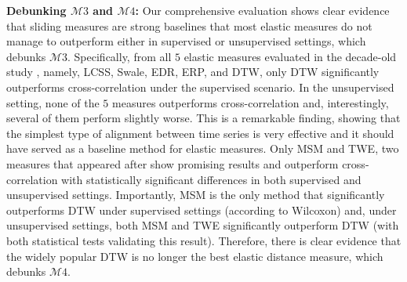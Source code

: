 \documentclass[11pt]{article}
\begin{document}
\noindent \textbf{Debunking $\mathcal{M}3$ and $\mathcal{M}4$: } Our comprehensive evaluation shows clear evidence that sliding measures are strong baselines that most elastic measures do not manage to outperform either in supervised or unsupervised settings, which debunks $\mathcal{M}3$. Specifically, from all $5$ elastic measures evaluated in the decade-old study \cite{ding2008querying}, namely, LCSS, Swale, EDR, ERP, and DTW, only DTW significantly outperforms cross-correlation under the supervised scenario. In the unsupervised setting, none of the $5$ measures outperforms cross-correlation and, interestingly, several of them perform slightly worse. This is a remarkable finding, showing that the simplest type of alignment between time series is very effective and it should have served as a baseline method for elastic measures. Only MSM and TWE, two measures that appeared after \cite{ding2008querying} show promising results and outperform cross-correlation with statistically significant differences in both supervised and unsupervised settings. Importantly, MSM is the only method that significantly outperforms DTW under supervised settings (according to Wilcoxon) and, under unsupervised settings, both MSM and TWE significantly outperform DTW (with both statistical tests validating this result). Therefore, there is clear evidence that the widely popular DTW is no longer the best elastic distance measure, which debunks $\mathcal{M}4$. 


\end{document}
